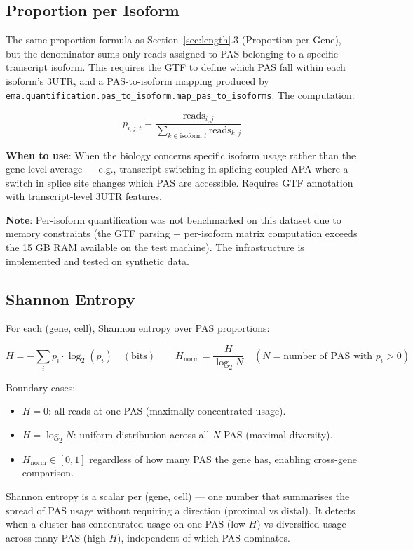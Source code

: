 \documentclass[11pt,a4paper]{article}
\begin{document}
\subsection{Proportion per Isoform}

The same proportion formula as Section~\ref{sec:length}.3 (Proportion per Gene), but
the denominator sums only reads assigned to PAS belonging to a specific transcript
isoform. This requires the GTF to define which PAS fall within each isoform's
3\textquotesingle UTR, and a PAS-to-isoform mapping produced by
\texttt{ema.quantification.pas\_to\_isoform.map\_pas\_to\_isoforms}. The computation:

\[
  p_{i,j,t} = \frac{\text{reads}_{i,j}}{\sum_{k \in \text{isoform } t} \text{reads}_{k,j}}
\]

\textbf{When to use}: When the biology concerns specific isoform usage rather than the
gene-level average --- e.g., transcript switching in splicing-coupled APA where a
switch in splice site changes which PAS are accessible. Requires GTF annotation with
transcript-level 3\textquotesingle UTR features.

\textbf{Note}: Per-isoform quantification was not benchmarked on this dataset due to
memory constraints (the GTF parsing + per-isoform matrix computation exceeds the 15 GB
RAM available on the test machine). The infrastructure is implemented and tested on
synthetic data.

\subsection{Shannon Entropy}

For each (gene, cell), Shannon entropy over PAS proportions:

\[
  H = -\sum_i p_i \cdot \log_2(p_i) \quad (\text{bits})
  \qquad
  H_{\text{norm}} = \frac{H}{\log_2 N} \quad (N = \text{number of PAS with } p_i > 0)
\]

Boundary cases:
\begin{itemize}
  \item $H = 0$: all reads at one PAS (maximally concentrated usage).
  \item $H = \log_2 N$: uniform distribution across all $N$ PAS (maximal diversity).
  \item $H_{\text{norm}} \in [0, 1]$ regardless of how many PAS the gene has,
        enabling cross-gene comparison.
\end{itemize}

Shannon entropy is a scalar per (gene, cell) --- one number that summarises the spread
of PAS usage without requiring a direction (proximal vs distal). It detects when a
cluster has concentrated usage on one PAS (low $H$) vs diversified usage across many
PAS (high $H$), independent of which PAS dominates.
\end{document}
